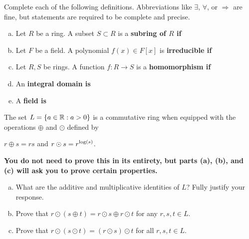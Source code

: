 \documentclass[11pt]{exam}
\begin{document}
\newpage %

%
%
%

\begin{questions}
\question[10] Complete each of the following definitions.  Abbreviations like $\exists$, $\forall$, or $\Rightarrow$ are fine, but statements are required to be complete and precise.
\begin{enumerate}[(a)]
\item Let $R$ be a ring.  A subset $S\subset R$ is a \bf subring \md of $R$ if
\vfill

\item Let $F$ be a field.  A polynomial $f(x)\in F[x]$ is \bf irreducible \md if 
\vfill

\item Let $R,S$ be rings.  A function $f:R\to S$ is a \bf homomorphism \md if
\vfill

\item An \bf integral domain \md is
\vfill

\item A \bf field \md is
\vfill

\end{enumerate}
\newpage

\question[10] The set $L = \left\{a\in\mathbb{R}:a > 0\right\}$ is a commutative ring when equipped with the operations $\oplus$ and $\odot$ defined by
\begin{center}
$r\oplus s = rs$ and $r\odot s = \displaystyle{r^{\log(s)}}$.
\end{center}
\textbf{You do not need to prove this in its entirety, but parts (a), (b), and (c) will ask you to prove certain properties.}
\begin{enumerate}[(a)]
\item What are the additive and multiplicative identities of $L$?  Fully justify your response.
\vfill

\item Prove that $r\odot(s \oplus t) = r\odot s \oplus r \odot t$ for any $r,s,t\in L$.
\vfill

\item Prove that $r\odot (s \odot t) = (r \odot s) \odot t$ for all $r,s,t\in L$.
\vfill


\end{enumerate}
\end{questions}
\end{document}
